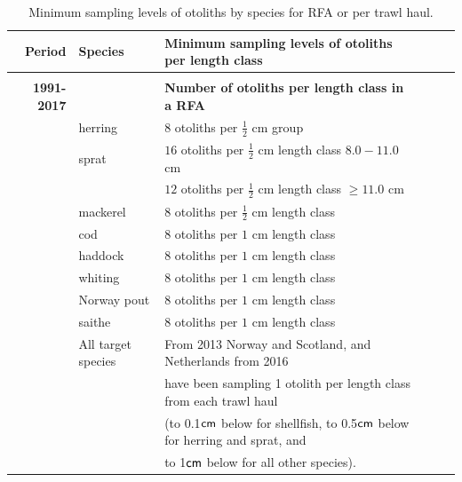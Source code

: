 \documentclass[a4paper 12pt]{article}
\numberwithin{equation}{section}
\newcommand{\cm}{\textnormal{\sffamily cm}\xspace}
\begin{document}
\begin{small}
\begin{table}[h!]
\centering
\caption{Minimum sampling levels of otoliths by species for RFA or per trawl haul.}
\label{tab:otolithsTable}
\begin{tabularx}{\linewidth}{r l l l l X}
\toprule 
Period &  Species  & Minimum sampling levels of otoliths per length class    \\[0.7ex]
\midrule \\[0.1ex]
{\bf 1991-2017} & & {\bf Number of otoliths per length class in a RFA}  \\[1.8ex]
     & herring  &  $8$  otoliths per $\frac{1}{2}$ cm group \\[0.8ex]
     & sprat    & $16$  otoliths per $\frac{1}{2}$ cm length class  $8.0 -11.0$ cm\\[0.8ex]
              & & $12$  otoliths per $\frac{1}{2}$ cm length class  $\geq 11.0$ cm\\[0.8ex]
& mackerel      & $8$  otoliths per $\frac{1}{2}$ cm length class \\[0.8ex]
& cod       	  & $8$  otoliths per $1$ cm length class\\[0.8ex]
&haddock   	  & $8$  otoliths per $1$ cm length class \\[0.8ex]
&whiting    	  & $8$  otoliths per $1$ cm length class \\[0.8ex]
&Norway pout   & $8$  otoliths per $1$ cm length class\\[0.8ex]
&saithe        & $8$  otoliths per $1$ cm length class \\[2ex] 
& All target species      &  From 2013 Norway and Scotland, and  Netherlands from 2016 \\[0.7ex] 
&& have been sampling 1 otolith per length class from each trawl haul \\[0.7ex] 
&& (to 0.1$\cm$ below for shellfish, to 0.5$\cm$ below for herring and sprat, and \\ [0.7ex] 
&& to 1$\cm$ below for all other species).\\[2.7ex] 


\end{tabularx}
\end{table}
\end{small}
\end{document}
